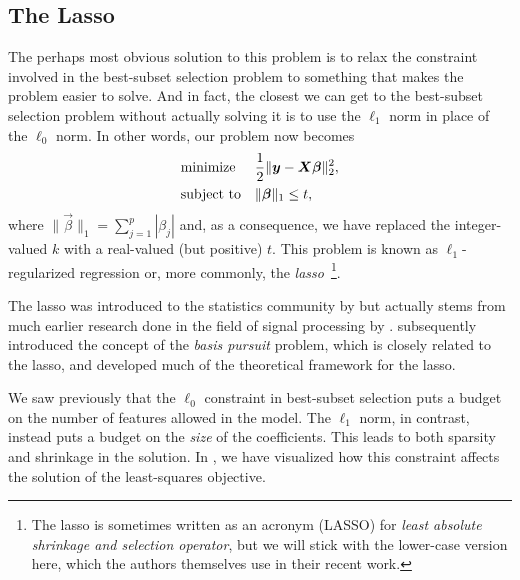 %
%

\subsection{The Lasso}

The perhaps most obvious solution to this problem is to relax the constraint involved in the best-subset selection problem to something that makes the problem easier to solve. And in fact, the closest we can get to the best-subset selection problem without actually solving it is to use the \(\ell_1\) norm in place of the \(\ell_0\) norm. In other words, our problem now becomes
\[
  \begin{aligned}
     & \text{minimize}   &  & \frac{1}{2} \lVert \boldsymbol{y} - \boldsymbol{X}\boldsymbol{\beta}\rVert^2_2, \\
     & \text{subject to} &  & \lVert \boldsymbol{\beta} \rVert_1 \leq t,
  \end{aligned}
\]
where \(\lVert \vec{\beta}\rVert_1 = \sum_{j=1}^p |\beta_j|\) and, as a consequence, we have replaced the integer-valued \(k\) with a real-valued (but positive) \(t\). This problem is known as \(\ell_1\)-regularized regression or, more commonly, the \emph{lasso}~\parencite{tibshirani1996}\footnote{The lasso is sometimes written as an acronym (LASSO) for \emph{least absolute shrinkage and selection operator}, but we will stick with the lower-case version here, which the authors themselves use in their recent work.}.

The lasso was introduced to the statistics community by \textcite{tibshirani1996} but actually stems from much earlier research done in the field of signal processing by \textcite{santosa1986}. \textcite{donoho1994,donoho1995} subsequently introduced the concept of the \emph{basis pursuit} problem, which is closely related to the lasso, and developed much of the theoretical framework for the lasso.

We saw previously that the \(\ell_0\) constraint in best-subset selection puts a budget on the number of features allowed in the model. The \(\ell_1\) norm, in contrast, instead puts a budget on the \emph{size} of the coefficients. This leads to both sparsity and shrinkage in the solution. In , we have visualized how this constraint affects the solution of the least-squares objective.

